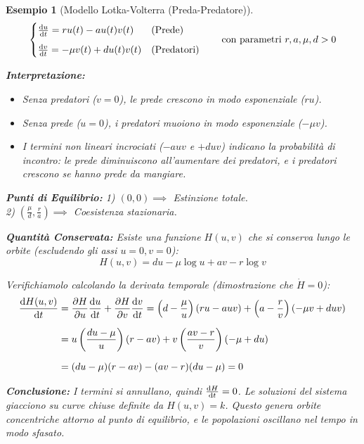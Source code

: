 \documentclass[openany]{book}
\newtheorem*{esempio}{Esempio}
\theoremstyle{definition}
\theoremstyle{remark}
\begin{document}
\begin{esempio}[Modello Lotka-Volterra (Preda-Predatore)]
\begin{equation*}
    \begin{cases}
        \dv{u}{t} = r u(t) - a u(t) v(t) & \text{(Prede)} \\[6pt]
        \dv{v}{t} = -\mu v(t) + d u(t) v(t) & \text{(Predatori)}
    \end{cases}
    \qquad \text{con parametri } r, a, \mu, d > 0
\end{equation*}

\textbf{Interpretazione:}
\begin{itemize}
    \item Senza predatori ($v=0$), le prede crescono in modo esponenziale ($r u$).
    \item Senza prede ($u=0$), i predatori muoiono in modo esponenziale ($-\mu v$).
    \item I termini non lineari incrociati ($-auv$ e $+duv$) indicano la probabilità di incontro: le prede diminuiscono all'aumentare dei predatori, e i predatori crescono se hanno prede da mangiare.
\end{itemize}

\textbf{Punti di Equilibrio:} 
1) $(0,0) \implies$ Estinzione totale. \\
2) $\left(\frac{\mu}{d}, \frac{r}{a}\right) \implies$ Coesistenza stazionaria.

\textbf{Quantità Conservata:}
Esiste una funzione $H(u,v)$ che si conserva lungo le orbite (escludendo gli assi $u=0, v=0$):
\begin{equation*}
    H(u,v) = d u - \mu \log u + a v - r \log v
\end{equation*}

Verifichiamolo calcolando la derivata temporale (dimostrazione che $\dot{H}=0$):
\begin{align*}
    \dv{H(u,v)}{t} &= \pdv{H}{u}\dv{u}{t} + \pdv{H}{v}\dv{v}{t} = \left( d - \frac{\mu}{u} \right)(ru - auv) + \left( a - \frac{r}{v} \right)(-\mu v + duv) \\[6pt]
    &= u \left( \frac{du - \mu}{u} \right) (r - av) + v \left( \frac{av - r}{v} \right) (-\mu + du) \\[6pt]
    &= (du - \mu)(r - av) - (av - r)(du - \mu) = 0
\end{align*}

\textbf{Conclusione:} I termini si annullano, quindi $\dv{H}{t} = 0$. Le soluzioni del sistema giacciono su curve chiuse definite da $H(u,v) = k$. Questo genera orbite concentriche attorno al punto di equilibrio, e le popolazioni oscillano nel tempo in modo sfasato.


\end{esempio}
\end{document}
